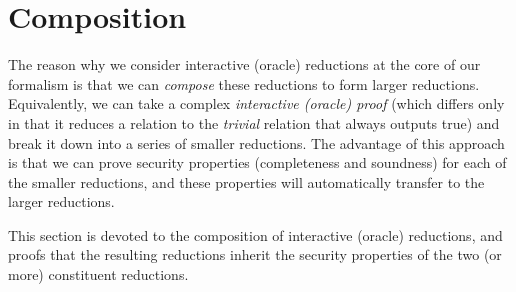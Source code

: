 \begin{definition}
    \label{def:state_function}
\end{definition}

\begin{definition}
    \label{def:round_by_round_soundness}
\end{definition}

\begin{definition}
    \label{def:round_by_round_knowledge_soundness}
\end{definition}

\section{Composition}

The reason why we consider interactive (oracle) reductions at the core of our formalism is that we can \emph{compose} these reductions to form larger reductions. Equivalently, we can take a complex \emph{interactive (oracle) proof} (which differs only in that it reduces a relation to the \emph{trivial} relation that always outputs true) and break it down into a series of smaller reductions. The advantage of this approach is that we can prove security properties (completeness and soundness) for each of the smaller reductions, and these properties will automatically transfer to the larger reductions.

This section is devoted to the composition of interactive (oracle) reductions, and proofs that the resulting reductions inherit the security properties of the two (or more) constituent reductions.

\begin{definition}
    \label{def:protocol_spec_composition}
\end{definition}

\begin{definition}
    \label{def:prover_composition}
\end{definition}

\begin{definition}
    \label{def:verifier_composition}
\end{definition}

